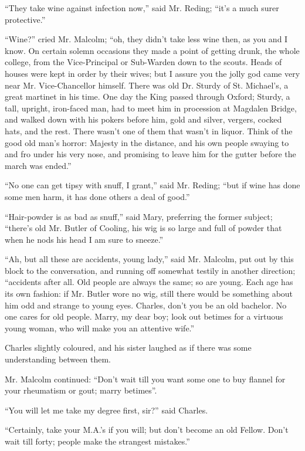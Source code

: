 ``They take wine against infection now,'' said Mr. Reding;
``it's a much surer protective.''

``Wine?'' cried Mr. Malcolm; ``oh, they didn't take
less wine then, as you and I know. On certain solemn occasions they
made a point of getting drunk, the whole college, from the
Vice-Principal or Sub-Warden down to the scouts. Heads of houses were
kept in order by their wives; but I assure you the jolly god came very
near Mr. Vice-Chancellor himself. There was old Dr. Sturdy of St.
Michael's, a great martinet in his time. One day the King passed
through Oxford; Sturdy, a tall, upright, iron-faced man, had to meet
him in procession at Magdalen Bridge, and walked down with his pokers before him, gold and silver, vergers, cocked hats, and the
rest. There wasn't one of them that wasn't in liquor. Think of the
good old man's horror: Majesty in the distance, and his own people
swaying to and fro under his very nose, and promising to leave him for
the gutter before the march was ended.''

``No one can get tipsy with snuff, I grant,'' said Mr.
Reding; ``but if wine has done some men harm, it has done others a
deal of good.''

``Hair-powder is as bad as snuff,'' said Mary, preferring
the former subject; ``there's old Mr. Butler of Cooling, his wig
is so large and full of powder that when he nods his head I am sure to
sneeze.''

``Ah, but all these are accidents, young lady,'' said Mr.
Malcolm, put out by this block to the conversation, and running off
somewhat testily in another direction; ``accidents after all. Old
people are always the same; so are young. Each age has its own
fashion: if Mr. Butler wore no wig, still there would be something
about him odd and strange to young eyes. Charles, don't you be an old
bachelor. No one cares for old people. Marry, my dear boy; look out
betimes for a virtuous young woman, who will make you an attentive
wife.''

Charles slightly coloured, and his sister laughed as if there was
some understanding between them.

Mr. Malcolm continued: ``Don't wait till you want some one to
buy flannel for your rheumatism or gout; marry betimes''.

``You will let me take my degree first, sir?'' said
Charles.

``Certainly, take your M.A.'s if you will; but don't become an old Fellow. Don't wait till forty; people make the strangest
mistakes.''

